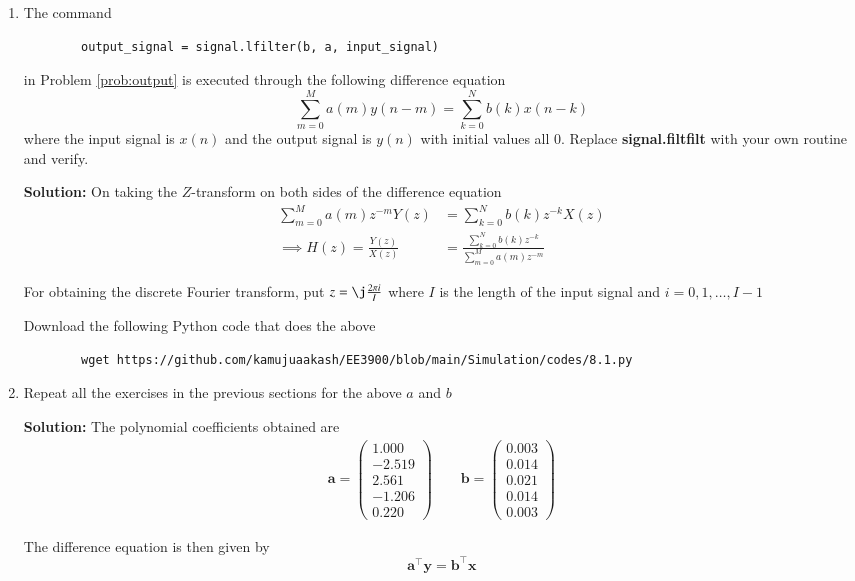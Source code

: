 \documentclass[journal,12pt,twocolumn]{IEEEtran}
\newcommand{\solution}{\noindent \textbf{Solution: }}
\providecommand{\brak}[1]{\ensuremath{\left(#1\right)}}
\let\vec\mathbf
\numberwithin{equation}{section}
\renewcommand\thesection{\arabic{section}}
\newcommand{\myvec}[1]{\ensuremath{\begin{pmatrix}#1\end{pmatrix}}}
\begin{document}
	\begin{enumerate}[label=\thesection.\arabic*]
	\item The command
	\begin{lstlisting}
		output_signal = signal.lfilter(b, a, input_signal)
	\end{lstlisting}
	in Problem \ref{prob:output} is executed through the following difference equation
	\begin{equation}
		\label{eq:iir_filter_gen}
 		\sum _{m=0}^{M}a\brak{m}y\brak{n-m}=\sum _{k=0}^{N}b\brak{k}x\brak{n-k}
	\end{equation}
	where the input signal is $x(n)$ and the output signal is $y(n)$ with initial values all 0. Replace \textbf{signal.filtfilt} with your own routine and verify.
	
	\solution On taking the $Z$-transform on both sides of the difference equation
	\begin{align}
		\sum _{m=0}^{M}a\brak{m} z^{-m} Y(z) &= \sum _{k=0}^{N}b\brak{k} z^{-k} X(z) \\
		\implies H(z) = \frac{Y(z)}{X(z)} &= \frac{\sum _{k=0}^{N}b\brak{k} z^{-k}}{\sum _{m=0}^{M}a\brak{m} z^{-m	}}
	\end{align}
	
	For obtaining the discrete Fourier transform, put $z = \j \frac{2\pi i}{I}$ where $I$ is the length of the input signal and $i = 0, 1, \ldots, I-1$
	
	Download the following Python code that does the above
	\begin{lstlisting}
		wget https://github.com/kamujuaakash/EE3900/blob/main/Simulation/codes/8.1.py
	\end{lstlisting}
	
	\item Repeat all the exercises in the previous sections for the above $a$ and $b$
	
	\solution The polynomial coefficients obtained are
	\begin{align}
		\vec{a} = \myvec{1.000 \\ -2.519 \\ 2.561 \\ -1.206 \\ 0.220} \qquad
		\vec{b} = \myvec{0.003 \\ 0.014 \\ 0.021 \\ 0.014 \\ 0.003}
	\end{align}
	
	The difference equation is then given by
	\begin{equation}
		\vec{a}^\top \vec{y} = \vec{b}^\top \vec{x} 
	\end{equation}
	

\end{enumerate}
\end{document}

